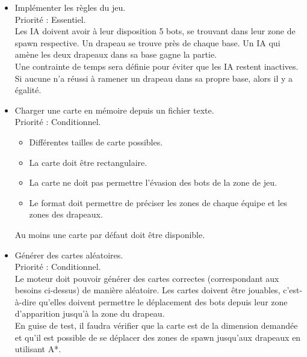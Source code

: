 \documentclass[french]{article}
\begin{document}
    \begin{itemize}
        
        \item Implémenter les règles du jeu. \\
                Priorité : Essentiel.\\
                Les IA doivent avoir à leur disposition 5 bots, se trouvant dans leur zone de spawn respective. Un drapeau se trouve près de chaque base. Un IA qui amène les deux drapeaux dans sa base gagne la partie.\\
                Une contrainte de temps sera définie pour éviter que les IA restent inactives. Si aucune n'a réussi à ramener un drapeau dans sa propre base, alors il y a égalité.\\
                
        \item Charger une carte en mémoire depuis un fichier texte. \\
                Priorité : Conditionnel.
                \begin{itemize}
                    \item Différentes tailles de carte possibles.
                    \item La carte doit être rectangulaire.
                    \item La carte ne doit pas permettre l'évasion des bots de la zone de jeu.
                    \item Le format doit permettre de préciser les zones de chaque équipe et les zones des drapeaux.
                \end{itemize}
                Au moins une carte par défaut doit être disponible. \\
                
        \item Générer des cartes aléatoires.\\
            Priorité : Conditionnel.\\
            Le moteur doit pouvoir générer des cartes correctes (correspondant aux besoins ci-dessus) de manière aléatoire. Les cartes doivent être jouables, c'est-à-dire qu'elles doivent permettre le déplacement des bots depuis leur zone d'apparition jusqu'à la zone du drapeau.\\
            En guise de test, il faudra vérifier que la carte est de la dimension demandée et qu'il est possible de se déplacer des zones de spawn jusqu'aux drapeaux en utilisant A*.\\


\end{itemize}
\end{document}
